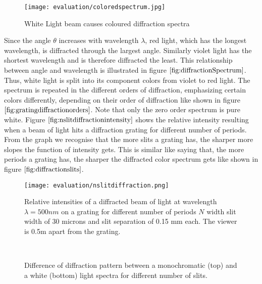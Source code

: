 \begin{figure}[H]
  \centering
  \texttt{[image: evaluation/coloredspectrum.jpg]}
  \caption{White Light beam causes coloured diffraction spectra}
  \label{fig:diffractionSpectrum}
\end{figure}

Since the angle $\theta$ increases with wavelength $\lambda$, red light, which has the longest wavelength, is diffracted through the largest angle. Similarly violet light has the shortest wavelength and is therefore diffracted the least. This relationship between angle and wavelength is illustrated in figure $\ref{fig:diffractionSpectrum}$. Thus, white light is split into its component colors from violet to red light. The spectrum is repeated in the different orders of diffraction, emphasizing certain colors differently, depending on their order of diffraction like shown in figure $\ref{fig:gratingdiffractionorders}$. Note that only the zero order spectrum is pure white.  
Figure $\ref{fig:nslitdiffractionintensity}$ shows the relative intensity resulting when a beam of light hits a diffraction grating for different number of periods. From the graph we recognise that the more slits a grating has, the sharper more slopes the function of intensity gets. This is similar like saying that, the more periods a grating has, the sharper the diffracted color spectrum gets like shown in figure $\ref{fig:diffractionslits}$. 

\begin{figure}[H]
  \centering
  \texttt{[image: evaluation/nslitdiffraction.png]}
  \caption{Relative intensities of a diffracted beam of light at wavelength $\lambda=500nm$ on a grating for different number of periods $N$ width slit width of 30 microns and slit separation of 0.15 mm each. The viewer is 0.5m apart from the grating.}
  \label{fig:nslitdiffractionintensity}
\end{figure}

\begin{figure}[H]
  \centering

~
  
  
\caption{Difference of diffraction pattern between a monochromatic (top) and a white (bottom) light spectra for different number of slits.}
\label{fig:diffractionslits}
\end{figure}

